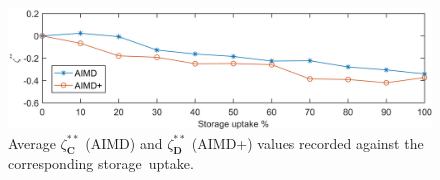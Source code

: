 \begin{figure}[htb]\centering
 \includegraphics{_chapter1/fig/input/utilisation-AIMD-compare}
 \caption{Average $\zeta_\textbf{C}^{**}$ (AIMD) and $\zeta_\textbf{D}^{**}$ (AIMD+) values recorded against the corresponding storage~uptake.}
 \label{ch1:fig:utilisation-aimd-compare}
\end{figure}
